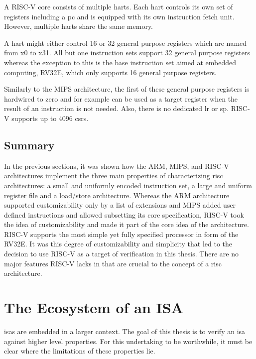 A RISC-V core consists of multiple \glspl{hart}.
Each \gls{hart} controls its own set of registers including a \gls{pc} and is equipped with its own instruction fetch unit.
However, multiple \glspl{hart} share the same memory.

A \gls{hart} might either control 16 or 32 general purpose registers which are named from x0 to x31.
All but one instruction sets support 32 general purpose registers whereas the exception to this is the base instruction set aimed at embedded computing, RV32E, which only supports 16 general purpose registers.

Similarly to the MIPS architecture, the first of these general purpose registers is hardwired to zero and for example can be used as a target register when the result of an instruction is not needed.
Also, there is no dedicated \gls{lr} or \gls{sp}.
RISC-V supports up to 4096 \glspl{csr}.

\subsection{Summary}

In the previous sections, it was shown how the ARM, MIPS, and RISC-V architectures implement the three main properties of \cite{Hennessy12} characterizing \gls{risc} architectures: a small and uniformly encoded instruction set, a large and uniform register file and a load/store architecture.
Whereas the ARM architecture supported customizability only by a list of extensions and MIPS added user defined instructions and allowed subsetting its core specification, RISC-V took the idea of customizability and made it part of the core idea of the architecture.
RISC-V supports the most simple yet fully specified processor in form of the RV32E.
It was this degree of customizability and simplicity that led to the decision to use RISC-V as a target of verification in this thesis.
There are no major features RISC-V lacks in that are crucial to the concept of a \gls{risc} architecture.

\section{The Ecosystem of an ISA}
\label{sec:ecosystem}

\glspl{isa} are embedded in a larger context.
The goal of this thesis is to verify an \gls{isa} against higher level properties.
For this undertaking to be worthwhile, it must be clear where the limitations of these properties lie.

